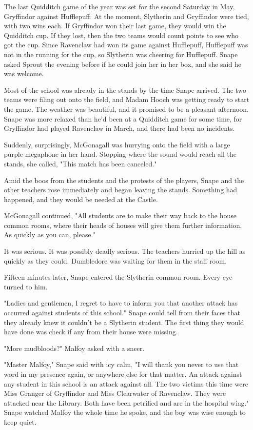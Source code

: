 \sbreak

The last Quidditch game of the year was set for the second Saturday in May, Gryffindor against Hufflepuff. At the moment, Slytherin and Gryffindor were tied, with two wins each. If Gryffindor won their last game, they would win the Quidditch cup. If they lost, then the two teams would count points to see who got the cup. Since Ravenclaw had won its game against Hufflepuff, Hufflepuff was not in the running for the cup, so Slytherin was cheering for Hufflepuff. Snape asked Sprout the evening before if he could join her in her box, and she said he was welcome.

Most of the school was already in the stands by the time Snape arrived. The two teams were filing out onto the field, and Madam Hooch was getting ready to start the game. The weather was beautiful, and it promised to be a pleasant afternoon. Snape was more relaxed than he'd been at a Quidditch game for some time, for Gryffindor had played Ravenclaw in March, and there had been no incidents.

Suddenly, surprisingly, McGonagall was hurrying onto the field with a large purple megaphone in her hand. Stopping where the sound would reach all the stands, she called, "This match has been canceled."

Amid the boos from the students and the protests of the players, Snape and the other teachers rose immediately and began leaving the stands. Something had happened, and they would be needed at the Castle.

McGonagall continued, "All students are to make their way back to the house common rooms, where their heads of houses will give them further information. As quickly as you can, please."

It was serious. It was possibly deadly serious. The teachers hurried up the hill as quickly as they could. Dumbledore was waiting for them in the staff room.

Fifteen minutes later, Snape entered the Slytherin common room. Every eye turned to him.

"Ladies and gentlemen, I regret to have to inform you that another attack has occurred against students of this school." Snape could tell from their faces that they already knew it couldn't be a Slytherin student. The first thing they would have done was check if any from their house were missing.

"More mudbloods?" Malfoy asked with a sneer.

"Master Malfoy," Snape said with icy calm, "I will thank you never to use that word in my presence again, or anywhere else for that matter. An attack against any student in this school is an attack against all. The two victims this time were Miss Granger of Gryffindor and Miss Clearwater of Ravenclaw. They were attacked near the Library. Both have been petrified and are in the hospital wing." Snape watched Malfoy the whole time he spoke, and the boy was wise enough to keep quiet.

